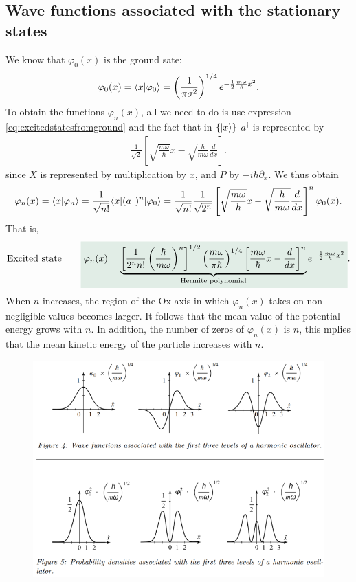 \subsection{Wave functions associated with the stationary states}
We know that $\varphi_0(x)$ is the ground sate:
\begin{align*}
    \varphi_0(x)=\langle x|\varphi_0\rangle=\left(\frac{1}{\pi\sigma^2}\right)^{1/4}e^{-\frac{1}{2}\frac{m\omega}{\hbar}x^2}.
\end{align*}
To obtain the functions $\varphi_n(x)$, all we need to do is use expression \eqref{eq:excitedstatesfromground} and the fact that in $\{|x\rangle\}$ $a^\dagger$ is represented by 
\begin{align}
    \frac{1}{\sqrt{2}}\left[\sqrt{\frac{m\omega}{\hbar}}x-\sqrt{\frac{\hbar}{m\omega}}\frac{d}{dx}\right].
\end{align}
since $X$ is represented by multiplication by $x$, and $P$ by $-i\hbar\partial_x$. We thus obtain
\begin{align}
    \varphi_n(x)=\langle x|\varphi_n\rangle=\frac{1}{\sqrt{n!}}\langle x|(a^\dagger)^n|\varphi_0\rangle=\frac{1}{\sqrt{n!}}\frac{1}{\sqrt{2^n}}\left[\sqrt{\frac{m\omega}{\hbar}}x-\sqrt{\frac{\hbar}{m\omega}}\frac{d}{dx}\right]^n\varphi_0(x).
\end{align}
That is, 
\begin{align}
    \text{Excited state}\qquad\highlight{\varphi_n(x)=\underbrace{\left[\frac{1}{2^nn!}\left(\frac{\hbar}{m\omega}\right)^n\right]^{1/2}\left(\frac{m\omega}{\pi\hbar}\right)^{1/4}\left[\frac{m\omega}{\hbar}x-\frac{d}{dx}\right]^n}_{\text{Hermite polynomial}}e^{-\frac{1}{2}\frac{m\omega}{\hbar}x^2}}.
\end{align}
When $n$ increases, the region of the Ox axis in which $\varphi_n(x)$ takes on non-negligible values becomes larger. It follows that the mean value of the potential 
energy grows with $n$. In addition, the number of zeros of $\varphi_n(x)$ is $n$, this mplies that the mean kinetic energy of the particle increases with $n$.
\begin{figure}[h!]
    \centering
    \includegraphics[width=.7\columnwidth]{PartOne/ChapterThree/excitedstatesqho.png}
\end{figure}


